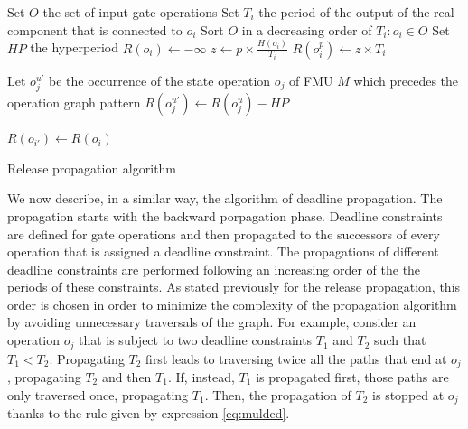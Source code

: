 \begin{algorithm}[!htp]	
	 Set $O$ the set of input gate operations\;
	 Set $T_i$ the period of the output of the real component that is connected to $o_i$\;
	 Sort $O$ in a decreasing order of $T_i: o_i \in O$\;
	 Set $HP$ the hyperperiod\;
	{
	  $R(o_i) \leftarrow -\infty$\;
	}
	{
		{
		  $z \leftarrow p \times \frac{H(o_i)}{T_i}$\;
			$R(o_i^p) \leftarrow z \times T_i$\;
			\;	
		}
	}
	
	
	{
		  Let $o_j^{u'}$ be the occurrence of the state operation $o_j$ of FMU $M$ which precedes the operation graph pattern\;
			$R(o_j^{u'}) \leftarrow R(o_j^u) - HP$\;
			\;	
	}
		
		{
			{
			{
				{
					$R(o_{i'}) \leftarrow R(o_i)$\;
					\;
				}
			}
			}
			\KwRet\;
		}
	\caption{Release propagation algorithm}
	\label{algo:release}
\end{algorithm} 

We now describe, in a similar way, the algorithm of deadline propagation. The propagation starts with the backward porpagation phase. Deadline constraints are defined for gate operations and then propagated to the successors of every operation that is assigned a deadline constraint. The propagations of different deadline constraints are performed following an increasing order of the the periods of these constraints. As stated previously for the release propagation, this order is chosen in order to minimize the complexity of the propagation algorithm by avoiding unnecessary traversals of the graph. For example, consider an operation $o_j$ that is subject to two deadline constraints $T_1$ and $T_2$ such that $T_1 < T_2$. Propagating $T_2$ first leads to traversing twice all the paths that end at $o_j$, propagating $T_2$ and then $T_1$. If, instead, $T_1$ is propagated first, those paths are only traversed once, propagating $T_1$. Then, the propagation of $T_2$ is stopped at $o_j$ thanks to the rule given by expression \ref{eq:mulded}.

